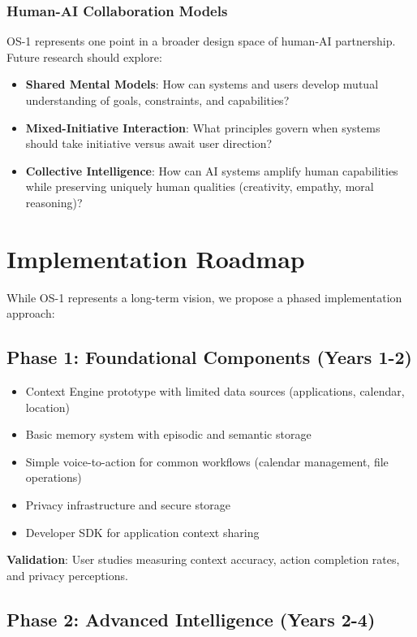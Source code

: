 \documentclass[conference]{IEEEtran}
\begin{document}
\subsubsection{Human-AI Collaboration Models}

OS-1 represents one point in a broader design space of human-AI partnership. Future research should explore:
\begin{itemize}
\item \textbf{Shared Mental Models}: How can systems and users develop mutual understanding of goals, constraints, and capabilities?
\item \textbf{Mixed-Initiative Interaction}: What principles govern when systems should take initiative versus await user direction?
\item \textbf{Collective Intelligence}: How can AI systems amplify human capabilities while preserving uniquely human qualities (creativity, empathy, moral reasoning)?
\end{itemize}

\section{Implementation Roadmap}

While OS-1 represents a long-term vision, we propose a phased implementation approach:

\subsection{Phase 1: Foundational Components (Years 1-2)}

\begin{itemize}
\item Context Engine prototype with limited data sources (applications, calendar, location)
\item Basic memory system with episodic and semantic storage
\item Simple voice-to-action for common workflows (calendar management, file operations)
\item Privacy infrastructure and secure storage
\item Developer SDK for application context sharing
\end{itemize}

\textbf{Validation}: User studies measuring context accuracy, action completion rates, and privacy perceptions.

\subsection{Phase 2: Advanced Intelligence (Years 2-4)}
\end{document}
